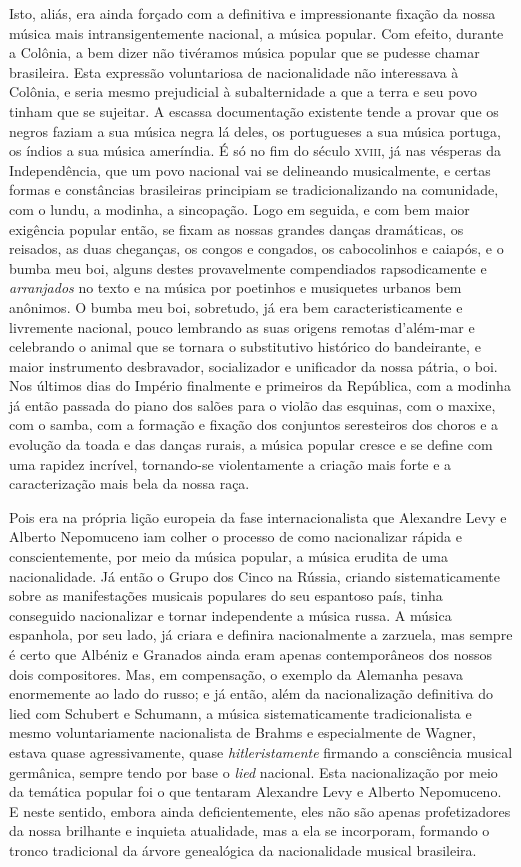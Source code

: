 Isto, aliás, era ainda forçado com a definitiva e impressionante fixação
da nossa música mais intransigentemente nacional, a música popular. Com
efeito, durante a Colônia, a bem dizer não tivéramos música popular que
se pudesse chamar brasileira. Esta expressão voluntariosa de
nacionalidade não interessava à Colônia, e seria mesmo prejudicial à
subalternidade a que a terra e seu povo tinham que se sujeitar. A
escassa documentação existente tende a provar que os negros faziam a sua
música negra lá deles, os portugueses a sua música portuga, os índios a
sua música ameríndia. É só no fim do século \textsc{xviii}, já nas vésperas da
Independência, que um povo nacional vai se delineando musicalmente, e
certas formas e constâncias brasileiras principiam se tradicionalizando
na comunidade, com o lundu, a modinha, a sincopação. Logo em seguida, e
com bem maior exigência popular então, se fixam as nossas grandes danças
dramáticas, os reisados, as duas cheganças, os congos e congados, os
cabocolinhos e caiapós, e o bumba meu boi, alguns destes provavelmente
compendiados rapsodicamente e \textit{arranjados} no texto e na música por
poetinhos e musiquetes urbanos bem anônimos. O bumba meu boi, sobretudo,
já era bem caracteristicamente e livremente nacional, pouco lembrando as
suas origens remotas d'além-mar e celebrando o animal que se tornara o
substitutivo histórico do bandeirante, e maior instrumento desbravador,
socializador e unificador da nossa pátria, o boi. Nos últimos dias do
Império finalmente e primeiros da República, com a modinha já então
passada do piano dos salões para o violão das esquinas, com o maxixe,
com o samba, com a formação e fixação dos conjuntos seresteiros dos
choros e a evolução da toada e das danças rurais, a música popular
cresce e se define com uma rapidez incrível, tornando-se violentamente a
criação mais forte e a caracterização mais bela da nossa raça.

Pois era na própria lição europeia da fase internacionalista que
Alexandre Levy e Alberto Nepomuceno iam colher o processo de como
nacionalizar rápida e conscientemente, por meio da música popular, a
música erudita de uma nacionalidade. Já então o Grupo dos Cinco na
Rússia, criando sistematicamente sobre as manifestações musicais
populares do seu espantoso país, tinha conseguido nacionalizar e tornar
independente a música russa. A música espanhola, por seu lado, já criara
e definira nacionalmente a zarzuela, mas sempre é certo que Albéniz e
Granados ainda eram apenas contemporâneos dos nossos dois compositores.
Mas, em compensação, o exemplo da Alemanha pesava enormemente ao lado do
russo; e já então, além da nacionalização definitiva do lied com
Schubert e Schumann, a música sistematicamente tradicionalista e mesmo
voluntariamente nacionalista de Brahms e especialmente de Wagner, estava
quase agressivamente, quase \textit{hitleristamente} firmando a consciência
musical germânica, sempre tendo por base o \textit{lied} nacional. Esta
nacionalização por meio da temática popular foi o que tentaram Alexandre
Levy e Alberto Nepomuceno. E neste sentido, embora ainda
deficientemente, eles não são apenas profetizadores da nossa brilhante e
inquieta atualidade, mas a ela se incorporam, formando o tronco
tradicional da árvore genealógica da nacionalidade musical brasileira.


